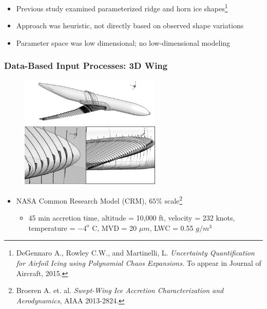 \documentclass[9pt]{beamer}
\begin{document}
\begin{frame}
\begin{itemize}
\item Previous study examined parameterized ridge and horn ice
  shapes\footnote{DeGennaro A., Rowley C.W., and Martinelli,
L. \emph{Uncertainty Quantification for Airfoil Icing using Polynomial Chaos Expansions}. To appear in Journal of Aircraft, 2015.
 }
\item Approach was heuristic, not directly based on observed shape
  variations
\item Parameter space was low dimensional; no low-dimensional modeling
\end{itemize}
\end{frame}
\begin{frame}
\frametitle{Data-Based Input Processes: 3D Wing}
\label{sec-3-2}

\begin{figure}
  \centering
  \includegraphics[width=0.6\textwidth]{CRMHorn}
\end{figure}

\begin{itemize}
\item NASA Common Research Model (CRM), $65\%$ scale\footnote{Broeren A. et. al. \emph{Swept-Wing Ice Accretion Characterization and Aerodynamics}, AIAA 2013-2824.
 }
\begin{itemize}
\item 45 min accretion time, altitude = 10,000 ft, velocity = 232 knots,
    temperature = $-4^{\text{o}}$ C, MVD = 20 $\mu m$, LWC = 0.55
    $g/m^3$
\end{itemize}
\end{itemize}
\end{frame}
\end{document}
